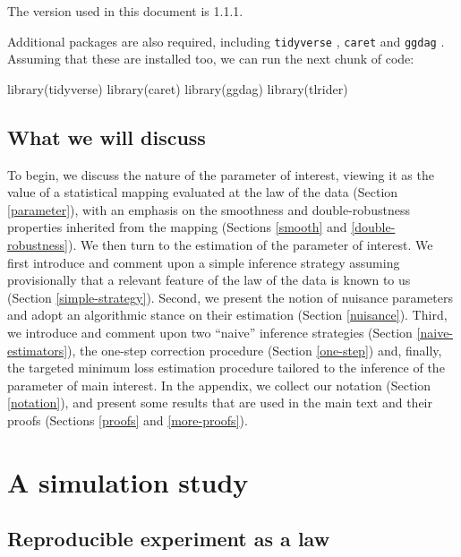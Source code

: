 \documentclass[
  11pt,
  openright,twoside]{book}
\newenvironment{Shaded}{\begin{snugshade}}{\end{snugshade}}
\newcommand{\FunctionTok}[1]{\textcolor[rgb]{0.00,0.00,0.00}{#1}}
\newcommand{\NormalTok}[1]{#1}
\theoremstyle{definition}
\theoremstyle{definition}
\theoremstyle{definition}
\theoremstyle{definition}
\theoremstyle{remark}
\begin{document}
The version used in this document is 1.1.1.

Additional packages are also required, including \texttt{tidyverse} \citep{r4ds}, \texttt{caret}
\citep{caret} and \texttt{ggdag} \citep{ggdag}. Assuming that these are installed too, we can
run the next chunk of code:

\begin{Shaded}
\begin{Highlighting}[]
\FunctionTok{library}\NormalTok{(tidyverse)}
\FunctionTok{library}\NormalTok{(caret)}
\FunctionTok{library}\NormalTok{(ggdag)}
\FunctionTok{library}\NormalTok{(tlrider)}
\end{Highlighting}
\end{Shaded}

\hypertarget{discuss}{%
\subsection{What we will discuss}\label{discuss}}

To begin, we discuss the nature of the parameter of interest, viewing it as
the value of a statistical mapping evaluated at the law of the data (Section
\ref{parameter}), with an emphasis on the smoothness and double-robustness
properties inherited from the mapping (Sections \ref{smooth} and
\ref{double-robustness}). We then turn to the estimation of the parameter of
interest. We first introduce and comment upon a simple inference strategy
assuming provisionally that a relevant feature of the law of the data is known
to us (Section \ref{simple-strategy}). Second, we present the notion of
nuisance parameters and adopt an algorithmic stance on their estimation
(Section \ref{nuisance}). Third, we introduce and comment upon two ``naive''
inference strategies (Section \ref{naive-estimators}), the one-step
correction procedure (Section \ref{one-step}) and, finally, the targeted
minimum loss estimation procedure tailored to the inference of the parameter
of main interest. In the appendix, we collect our notation (Section
\ref{notation}), and present some results that are used in the main text and
their proofs (Sections \ref{proofs} and \ref{more-proofs}).

\hypertarget{simulation-study}{%
\section{A simulation study}\label{simulation-study}}

\hypertarget{reproducible-experiment}{%
\subsection{Reproducible experiment as a law}\label{reproducible-experiment}}
\end{document}
